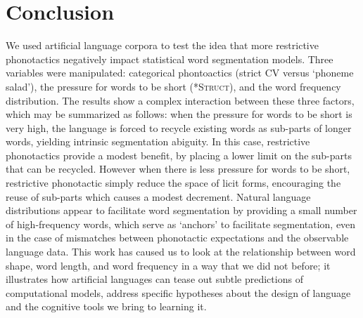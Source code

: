 \documentclass[11pt]{article}
\begin{document}
\section{Conclusion}
\vspace*{-5pt}
We used artificial language corpora to test the idea that more restrictive phonotactics negatively impact statistical word segmentation models. Three variables were manipulated: categorical phontoactics (strict CV versus `phoneme salad'), the pressure for words to be short (\textsc{*Struct}), and the word frequency distribution. The results show a complex interaction between these three factors, which may be summarized as follows: when the pressure for words to be short is very high, the language is forced to recycle existing words as sub-parts of longer words, yielding intrinsic segmentation abiguity. In this case, restrictive phonotactics provide a modest benefit, by placing a lower limit on the sub-parts that can be recycled. However when there is less pressure for words to be short, restrictive phonotactic simply reduce the space of licit forms, encouraging the reuse of sub-parts which causes a modest decrement. Natural language distributions appear to facilitate word segmentation by providing a small number of high-frequency words, which serve as `anchors' to facilitate segmentation, even in the case of mismatches between phonotactic expectations and the observable language data. This work has caused us to look at the relationship between word shape, word length, and word frequency in a way that we did not before; it illustrates how artificial languages can tease out subtle predictions of computational models, address specific hypotheses about the design of language and the cognitive tools we bring to learning it.



\end{document}
